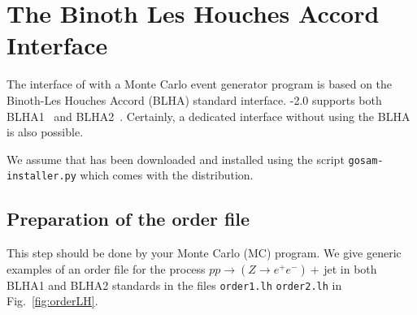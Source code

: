 %

\chapter{The Binoth Les Houches Accord Interface}
\label{sec:blha}


The interface of \gosam{} with a Monte Carlo event generator program 
is based on the Binoth-Les Houches Accord (BLHA)
standard interface.
\gosam{}-2.0 supports both BLHA1~\cite{Binoth:2010xt}
and BLHA2~\cite{Alioli:2013nda}.
Certainly, a dedicated interface without using the BLHA is also possible.

We assume that \gosam{} has been downloaded and installed using the script
\texttt{gosam-installer.py} which comes with the distribution. 


\section{Preparation of the order file}
This step should be done by your Monte Carlo (MC) program. 
We give generic examples of an order file for the process 
$pp\to (Z\to e^+e^-)+$\,jet in both BLHA1 and BLHA2 standards in the files 
\texttt{order1.lh} \texttt{order2.lh}  in Fig.~\ref{fig:orderLH}.

